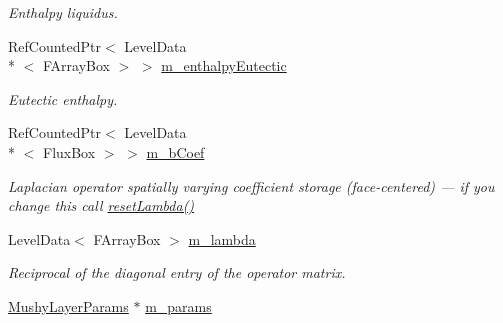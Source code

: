 \begin{DoxyCompactItemize}
\begin{DoxyCompactList}\small\item\em Enthalpy liquidus. \end{DoxyCompactList}\item 
\hypertarget{class_a_m_r_non_linear_v_c_op_a624b9245703e37de72d5a57d70ab0c7d}{Ref\-Counted\-Ptr$<$ Level\-Data\\*
$<$ F\-Array\-Box $>$ $>$ \hyperlink{class_a_m_r_non_linear_v_c_op_a624b9245703e37de72d5a57d70ab0c7d}{m\-\_\-enthalpy\-Eutectic}}\label{class_a_m_r_non_linear_v_c_op_a624b9245703e37de72d5a57d70ab0c7d}

\begin{DoxyCompactList}\small\item\em Eutectic enthalpy. \end{DoxyCompactList}\item 
\hypertarget{class_a_m_r_non_linear_v_c_op_aa7ed20fe362ea8b486d5b7c590d27cd1}{Ref\-Counted\-Ptr$<$ Level\-Data\\*
$<$ Flux\-Box $>$ $>$ \hyperlink{class_a_m_r_non_linear_v_c_op_aa7ed20fe362ea8b486d5b7c590d27cd1}{m\-\_\-b\-Coef}}\label{class_a_m_r_non_linear_v_c_op_aa7ed20fe362ea8b486d5b7c590d27cd1}

\begin{DoxyCompactList}\small\item\em Laplacian operator spatially varying coefficient storage (face-\/centered) --- if you change this call \hyperlink{class_a_m_r_non_linear_v_c_op_add4e1fcde22b295a038e786cf0c1152a}{reset\-Lambda()} \end{DoxyCompactList}\item 
\hypertarget{class_a_m_r_non_linear_v_c_op_acddda1cd5b8dafa273165635b9944d8a}{Level\-Data$<$ F\-Array\-Box $>$ \hyperlink{class_a_m_r_non_linear_v_c_op_acddda1cd5b8dafa273165635b9944d8a}{m\-\_\-lambda}}\label{class_a_m_r_non_linear_v_c_op_acddda1cd5b8dafa273165635b9944d8a}

\begin{DoxyCompactList}\small\item\em Reciprocal of the diagonal entry of the operator matrix. \end{DoxyCompactList}\item 
\hypertarget{class_a_m_r_non_linear_v_c_op_a1cbdc0704eb5746e13d571fe9b091057}{\hyperlink{class_mushy_layer_params}{Mushy\-Layer\-Params} $\ast$ \hyperlink{class_a_m_r_non_linear_v_c_op_a1cbdc0704eb5746e13d571fe9b091057}{m\-\_\-params}}\label{class_a_m_r_non_linear_v_c_op_a1cbdc0704eb5746e13d571fe9b091057}


\end{DoxyCompactItemize}

